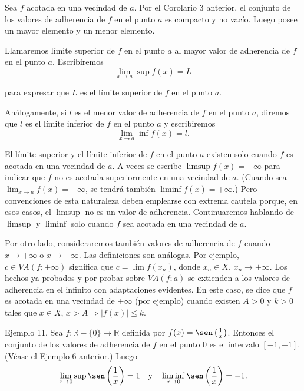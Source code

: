 \documentclass[12pt,oneside]{book}
\begin{document}
Sea \( f \) acotada en una vecindad de \( a \). Por el Corolario 3 anterior, el conjunto de los valores de adherencia de \( f \) en el punto \( a \) es compacto y no vacío. Luego posee un mayor elemento y un menor elemento.

Llamaremos límite superior de \( f \) en el punto \( a \) al mayor valor de adherencia de \( f \) en el punto \( a \). Escribiremos
\[
\lim_{x \to a} \sup f(x) = L
\]

para expresar que \( L \) es el límite superior de \( f \) en el punto \( a \).

Análogamente, si \( l \) es el menor valor de adherencia de \( f \) en el punto \( a \), diremos que \( l \) es el límite inferior de \( f \) en el punto \( a \) y escribiremos
\[
\lim_{x \to a} \inf f(x) = l.
\]

El límite superior y el límite inferior de \( f \) en el punto \( a \) existen solo cuando \( f \) es acotada en una vecindad de \( a \). A veces se escribe \( \limsup f(x) = +\infty \) para indicar que \( f \) no es acotada superiormente en una vecindad de \( a \). (Cuando sea \( \lim_{x \to a} f(x) = +\infty \), se tendrá también \( \liminf f(x) = +\infty \).) Pero convenciones de esta naturaleza deben emplearse con extrema cautela porque, en esos casos, el \( \limsup \) no es un valor de adherencia. Continuaremos hablando de \( \limsup \) y \( \liminf \) solo cuando \( f \) sea acotada en una vecindad de \( a \).

Por otro lado, consideraremos también valores de adherencia de \( f \) cuando \( x \to +\infty \) o \( x \to -\infty \). Las definiciones son análogas. Por ejemplo, \( c \in VA(f; +\infty) \) significa que \( c = \lim f(x_n) \), donde \( x_n \in X \), \( x_n \to +\infty \). Los hechos ya probados y por probar sobre \( VA(f; a) \) se extienden a los valores de adherencia en el infinito con adaptaciones evidentes. En este caso, se dice que \( f \) es acotada en una vecindad de \( +\infty \) (por ejemplo) cuando existen \( A > 0 \) y \( k > 0 \) tales que \( x \in X \), \( x > A \Rightarrow |f(x)| \leq k \).

Ejemplo 11. Sea \( f : \mathbb{R} - \{0\} \to \mathbb{R} \) definida por \( f(x) = \sen \left( \frac{1}{x} \right) \). Entonces el conjunto de los valores de adherencia de \( f \) en el punto \( 0 \) es el intervalo \([-1, +1]\). (Véase el Ejemplo 6 anterior.) Luego
\[
\lim_{x \to 0} \sup \sen \left( \frac{1}{x} \right) = 1 \quad \text{y} \quad \liminf_{x \to 0} \sen \left( \frac{1}{x} \right) = -1.
\]
\end{document}
